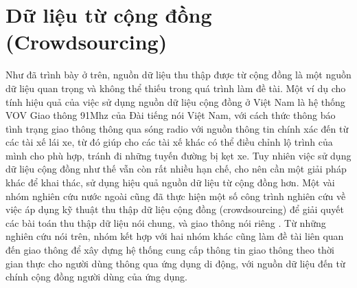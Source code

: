 \section{Dữ liệu từ cộng đồng (Crowdsourcing)}
Như đã trình bày ở trên, nguồn dữ liệu thu thập được từ cộng đồng là một nguồn dữ liệu quan trọng và không thể thiếu trong quá trình làm đề tài. Một ví dụ cho tính hiệu quả của việc sử dụng nguồn dữ liệu cộng đồng ở Việt Nam là hệ thống VOV Giao thông 91Mhz của Đài tiếng nói Việt Nam, với cách thức thông báo tình trạng giao thông thông qua sóng radio với nguồn thông tin chính xác đến từ các tài xế lái xe, từ đó giúp cho các tài xế khác có thể điều chỉnh lộ trình của mình cho phù hợp, tránh đi những tuyến đường bị kẹt xe. Tuy nhiên việc sử dụng dữ liệu cộng đồng như thế vẫn còn rất nhiều hạn chế, cho nên cần một giải pháp khác để khai thác, sử dụng hiệu quả nguồn dữ liệu từ cộng đồng hơn. Một vài nhóm nghiên cứu nước ngoài cũng đã thực hiện một số công trình nghiên cứu về việc áp dụng kỹ thuật thu thập dữ liệu cộng đồng (crowdsourcing) để giải quyết các bài toán thu thập dữ liệu nói chung, và giao thông nói riêng \cite{CROWND1} \cite{CROWND2} \cite{CROWND3} \cite{CROWND4}. Từ những nghiên cứu nói trên, nhóm kết hợp với hai nhóm khác cũng làm đề tài liên quan đến giao thông để xây dựng hệ thống cung cấp thông tin giao thông theo thời gian thực cho người dùng thông qua ứng dụng di động, với nguồn dữ liệu đến từ chính cộng đồng người dùng của ứng dụng.